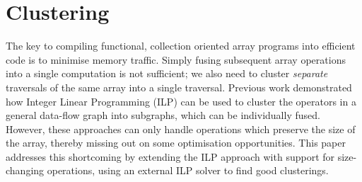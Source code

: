 \chapter{Clustering}
\label{part:clustering}



The key to compiling functional, collection oriented array programs into efficient code is to minimise memory traffic.
Simply fusing subsequent array operations into a single computation is not sufficient; we also need to cluster \emph{separate} traversals of the same array into a single traversal.
Previous work demonstrated how Integer Linear Programming (ILP) can be used to cluster the operators in a general data-flow graph into subgraphs, which can be individually fused.
However, these approaches can only handle operations which preserve the size of the array, thereby missing out on some optimisation opportunities.
This paper addresses this shortcoming by extending the ILP approach with support for size-changing operations, using an external ILP solver to find good clusterings.












